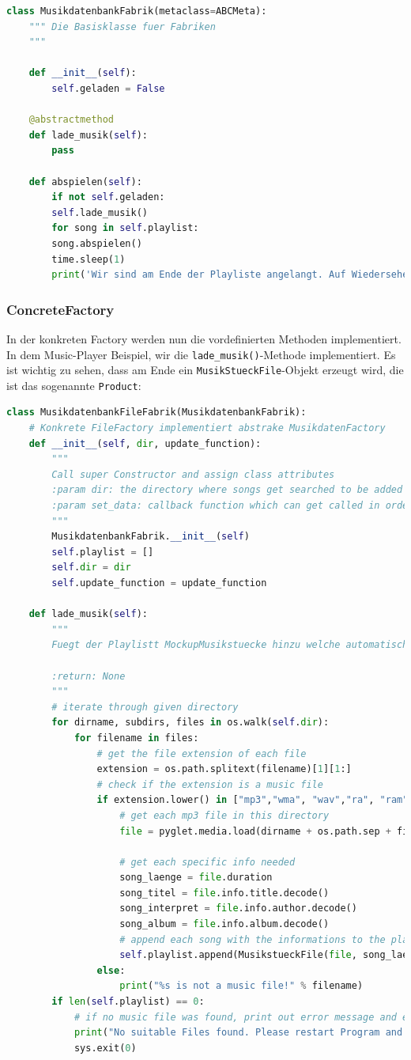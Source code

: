 \begin{lstlisting}[language=python]
class MusikdatenbankFabrik(metaclass=ABCMeta):
	""" Die Basisklasse fuer Fabriken
	"""
	
	def __init__(self):
		self.geladen = False
	
	@abstractmethod
	def lade_musik(self):
		pass
	
	def abspielen(self):
		if not self.geladen:
		self.lade_musik()
		for song in self.playlist:
		song.abspielen()
		time.sleep(1)
		print('Wir sind am Ende der Playliste angelangt. Auf Wiedersehen!')

\end{lstlisting}


\subsubsection{ConcreteFactory}
In der konkreten Factory werden nun die vordefinierten Methoden implementiert. In dem Music-Player Beispiel, wir die \verb|lade_musik()|-Methode implementiert. Es ist wichtig zu sehen, dass am Ende ein \verb|MusikStueckFile|-Objekt erzeugt wird, die ist das sogenannte \verb|Product|:

\begin{lstlisting}[language=python]
class MusikdatenbankFileFabrik(MusikdatenbankFabrik):
	# Konkrete FileFactory implementiert abstrake MusikdatenFactory
	def __init__(self, dir, update_function):
		"""
		Call super Constructor and assign class attributes
		:param dir: the directory where songs get searched to be added to the playlist
		:param set_data: callback function which can get called in order to update the data in the gui
		"""
		MusikdatenbankFabrik.__init__(self)
		self.playlist = []
		self.dir = dir
		self.update_function = update_function
	
	def lade_musik(self):
		"""
		Fuegt der Playlistt MockupMusikstuecke hinzu welche automatisch ausgelesen werden
		
		:return: None
		"""
		# iterate through given directory
		for dirname, subdirs, files in os.walk(self.dir):
			for filename in files:
				# get the file extension of each file
				extension = os.path.splitext(filename)[1][1:]
				# check if the extension is a music file
				if extension.lower() in ["mp3","wma", "wav","ra", "ram", "rm", "mid", "flac", "ogg"]:
					# get each mp3 file in this directory
					file = pyglet.media.load(dirname + os.path.sep + filename)
	
					# get each specific info needed
					song_laenge = file.duration
					song_titel = file.info.title.decode()
					song_interpret = file.info.author.decode()
					song_album = file.info.album.decode()
					# append each song with the informations to the playlist and the gui object
					self.playlist.append(MusikstueckFile(file, song_laenge, song_titel, song_interpret, song_album, self.update_function))
				else:
					print("%s is not a music file!" % filename)
		if len(self.playlist) == 0:
			# if no music file was found, print out error message and exit program
			print("No suitable Files found. Please restart Program and choose another Folder")
			sys.exit(0)
\end{lstlisting}

